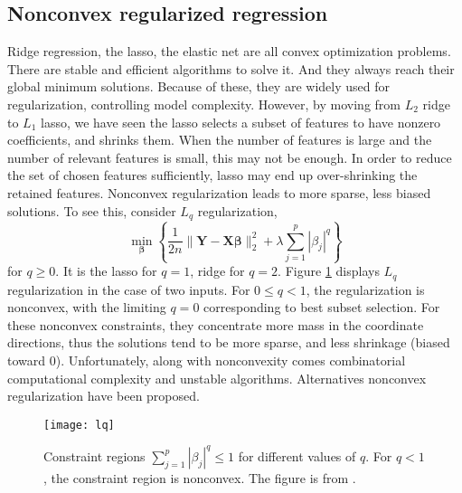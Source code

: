 \subsection{Nonconvex regularized regression} \label{sec:nonconvex}
Ridge regression, the lasso, the elastic net are all convex optimization problems. There are stable and efficient algorithms to solve it. And they always reach their global minimum solutions. Because of these, they are widely used for regularization, controlling model complexity. However, by moving from $L_2$ ridge to $L_1$ lasso, we have seen the lasso selects a subset of features to have nonzero coefficients, and shrinks them. When the number of features is large and the number of relevant features is small, this may not be enough. In order to reduce the set of chosen features sufficiently, lasso may end up over-shrinking the retained features. Nonconvex regularization leads to more sparse, less biased solutions. To see this, consider $L_q$ regularization,
\begin{equation}
    \min_{\bm{\beta}} \left\{ \frac{1}{2n}\|\bm{Y} - \bm{X\beta}\|_2^2 + \lambda \sum_{j=1}^{p}|\beta_j|^q \right\} \label{eq1.15}
\end{equation}
for $q\geq0$. It is the lasso for $q=1$, ridge for $q=2$. Figure \ref{fig:lq} displays $L_q$ regularization in the case of two inputs. For $0 \leq q <1$, the regularization is nonconvex, with the limiting $q=0$ corresponding to best subset selection. For these nonconvex constraints, they concentrate more mass in the coordinate directions, thus the solutions tend to be more sparse, and less shrinkage (biased toward 0). Unfortunately, along with nonconvexity comes combinatorial computational complexity and unstable algorithms. Alternatives nonconvex regularization have been proposed.
\begin{figure}[tbh]
  \centering
  \texttt{[image: lq]}
  \caption[Constraint regions $\sum_{j=1}^p|\beta_j|^q\leq1$ for different values of $q$] {
    Constraint regions $\sum_{j=1}^p|\beta_j|^q\leq1$ for different values of $q$. For $q<1$, the constraint region is nonconvex. The figure is from \cite{hastie2009elements}. 
  }
  \label{fig:lq}
\end{figure}

